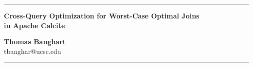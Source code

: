 \thispagestyle{empty}

\noindent\rule{\textwidth}{1.5pt}

\vspace{0.3cm}

\noindent\colorbox{titlebg}{%
  \parbox{\dimexpr\textwidth-2\fboxsep}{%
    \centering\vspace{0.4cm}
    {\LARGE\bfseries Cross-Query Optimization for Worst-Case Optimal Joins\\[0.25em]
    in Apache Calcite}
    \vspace{0.4cm}
  }%
}

\vspace{0.6cm}

\begin{center}
{\large\bfseries Thomas Banghart}\\[0.2em]
{\ttfamily tbanghar@ucsc.edu}
\end{center}

\vspace{0.3cm}

\noindent\rule{\textwidth}{0.4pt}

\vspace{0.5cm}
